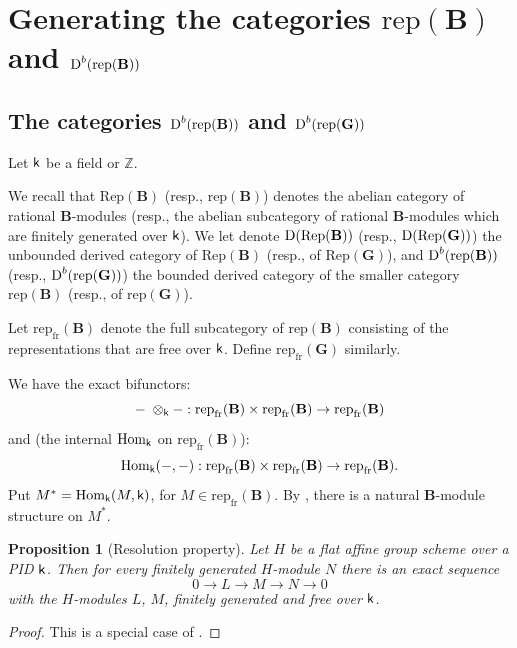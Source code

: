 \documentclass[sn-mathphys-num]{sn-jnl}%
\newcommand{\rep}{{\mathrm{rep}}}
\newcommand{\Rep}{{\mathrm{Rep}}}
\newcommand{\fr}{{\mathrm {fr}}}
\newcommand*{\Dd}{\mathop{\mathrm D\kern0pt}\nolimits}
\newcommand*{\Hom}{\mathop{\mathrm {Hom}}\nolimits}
\newcommand{\sk}{{\sf k}}
\newcommand{\Z}{{\mathbb Z}}
\newcommand{\bg}{\mathbf G}
\newcommand{\fb}{\mathbf B}
\newtheorem{proposition}[theorem]{Proposition}
\theoremstyle{definition}
\begin{document}
\section{Generating the categories $\rep({\fb})$ and $\Dd^b (\rep ({\fb}))$}\label{sec:B-generation}

\subsection{The categories $\Dd^b (\rep ({\fb}))$ and $\Dd^b (\rep ( \bg))$}%
\label{subsec:bounded-triang_cat}
Let $\sk$ be a field or $\Z$.

We recall that $\Rep(\fb)$ (resp., $\rep(\fb)$) denotes the abelian category 
of rational $\fb$-modules 
(resp., the abelian subcategory of rational $\fb$-modules which are finitely generated over $\sk$). 
We let denote $\Dd(\Rep ({\fb}))$ (resp., $\Dd(\Rep ( \bg))$) the unbounded derived category of $\Rep(\fb)$ (resp., of $\Rep ( \bg)$), 
and $\Dd^b (\rep ({\fb}))$ (resp., $\Dd^b (\rep ( \bg))$) the bounded derived category of the smaller category $\rep(\fb)$ (resp., of $\rep ( \bg)$).

Let $\rep_\fr( \fb)$ denote the full subcategory of $\rep( \fb)$ consisting of the representations that are free over $\sk$.
Define $\rep_\fr( \bg)$
similarly.

We have the exact bifunctors:
$$-\;\otimes_\sk-:\rep_\fr( \fb)\times \rep_\fr( \fb)\to \rep_\fr( \fb)$$ 
and (the internal $\Hom _\sk$ on $\rep_\fr( \fb)$):
$$\Hom_\sk(-,-):\rep_\fr( \fb)\times \rep_\fr( \fb)\to \rep_\fr( \fb).$$ 
Put $M^*=\Hom_\sk(M,\sk)$,
for $M\in\rep_\fr( \fb)$. By \cite[I, Section 2.7, (4)]{Jan}, there is a natural $\fb$-module structure on $M^*$.

\begin{proposition}[Resolution property]\label{prop:resolution}
    Let $ H$ be a flat affine group scheme over a PID $\sk$.
    Then for every finitely generated $ H$-module $N$ there is an exact sequence $$0\to L\to M\to N\to0$$ with the
    $ H$-modules $L$, $M$, finitely generated and free over $\sk$. 
\end{proposition}
\begin{proof}
    This is a special case of \cite[Proposition 3]{Serre}.
\end{proof}
\end{document}
